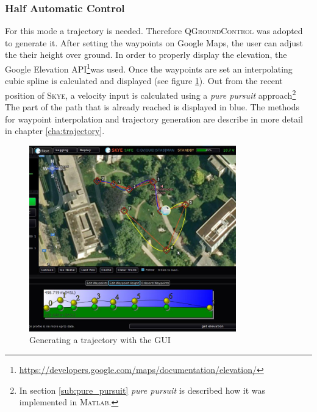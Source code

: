 \subsubsection{Half Automatic Control}
\label{subsub:halfautomaticcontrol}
For this mode a trajectory is needed. Therefore \textsc{QGroundControl} was adopted to generate it. After setting the waypoints on Google Maps, the user can adjust the their height over ground. In order to properly display the elevation, the Google Elevation API\footnote{\url{https://developers.google.com/maps/documentation/elevation/}}was used. Once the waypoints are set an interpolating cubic spline is calculated and displayed (see figure \ref{fig:qgc_automatic_control}). Out from the recent position of \textsc{Skye}, a velocity input is calculated using a \textit{pure pursuit} approach\footnote{In section \ref{sub:pure_pursuit} \textit{pure pursuit} is described how it was implemented in \textsc{Matlab}.} The part of the path that is already reached is displayed in blue. The methods for waypoint interpolation and trajectory generation are describe in more detail in chapter \ref{cha:trajectory}.%

\begin{figure}[H] %
	\begin{center}
		\includegraphics[width=0.8\textwidth]{qgc_automatic_control}
		\caption{Generating a trajectory with the GUI}
		\label{fig:qgc_automatic_control}		
	\end{center}
\end{figure}

